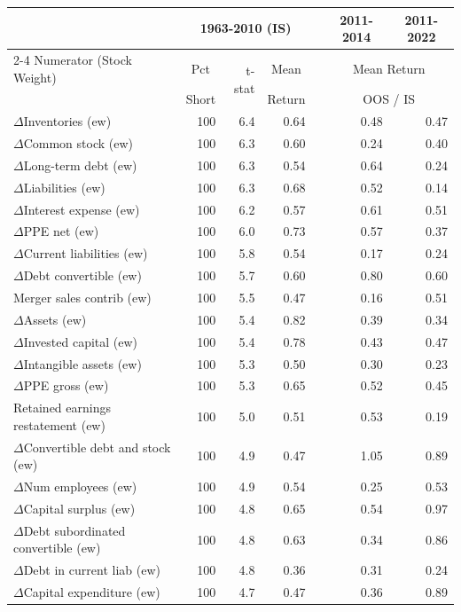 
\begin{tabular}{lrrrlrr}
\toprule
 & \multicolumn{3}{c}{1963-2010 (IS)} &  & \multicolumn{1}{c}{2011-2014} & \multicolumn{1}{c}{2011-2022} \\ \cmidrule{2-4} \cmidrule{6-7}
Numerator (Stock Weight) & \multicolumn{1}{c}{Pct} & \multirow{2}{*}{t-stat} & \multicolumn{1}{c}{Mean} &  & \multicolumn{2}{c}{Mean Return} \\  
 & \multicolumn{1}{c}{Short} &  & \multicolumn{1}{c}{Return} &  & \multicolumn{2}{c}{OOS / IS} \\ 
\midrule
$\Delta$Inventories (ew) & 100 & 6.4 & 0.64 &  & 0.48 & 0.47\\
$\Delta$Common stock (ew) & 100 & 6.3 & 0.60 &  & 0.24 & 0.40\\
$\Delta$Long-term debt (ew) & 100 & 6.3 & 0.54 &  & 0.64 & 0.24\\
$\Delta$Liabilities (ew) & 100 & 6.3 & 0.68 &  & 0.52 & 0.14\\
$\Delta$Interest expense (ew) & 100 & 6.2 & 0.57 &  & 0.61 & 0.51\\
$\Delta$PPE net (ew) & 100 & 6.0 & 0.73 &  & 0.57 & 0.37\\
$\Delta$Current liabilities (ew) & 100 & 5.8 & 0.54 &  & 0.17 & 0.24\\
$\Delta$Debt convertible (ew) & 100 & 5.7 & 0.60 &  & 0.80 & 0.60\\
Merger sales contrib (ew) & 100 & 5.5 & 0.47 &  & 0.16 & 0.51\\
$\Delta$Assets (ew) & 100 & 5.4 & 0.82 &  & 0.39 & 0.34\\
$\Delta$Invested capital (ew) & 100 & 5.4 & 0.78 &  & 0.43 & 0.47\\
$\Delta$Intangible assets (ew) & 100 & 5.3 & 0.50 &  & 0.30 & 0.23\\
$\Delta$PPE gross (ew) & 100 & 5.3 & 0.65 &  & 0.52 & 0.45\\
Retained earnings restatement (ew) & 100 & 5.0 & 0.51 &  & 0.53 & 0.19\\
$\Delta$Convertible debt and stock (ew) & 100 & 4.9 & 0.47 &  & 1.05 & 0.89\\
$\Delta$Num employees (ew) & 100 & 4.9 & 0.54 &  & 0.25 & 0.53\\
$\Delta$Capital surplus (ew) & 100 & 4.8 & 0.65 &  & 0.54 & 0.97\\
$\Delta$Debt subordinated convertible (ew) & 100 & 4.8 & 0.63 &  & 0.34 & 0.86\\
$\Delta$Debt in current liab (ew) & 100 & 4.8 & 0.36 &  & 0.31 & 0.24\\
$\Delta$Capital expenditure (ew) & 100 & 4.7 & 0.47 &  & 0.36 & 0.89\\
\bottomrule
\end{tabular}
